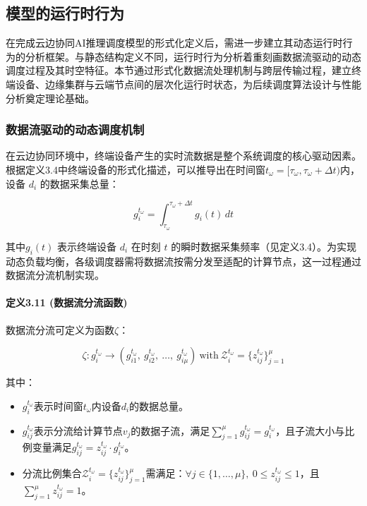 \subsection{模型的运行时行为}

在完成云边协同AI推理调度模型的形式化定义后，需进一步建立其动态运行时行为的分析框架。与静态结构定义不同，运行时行为分析着重刻画数据流驱动的动态调度过程及其时空特征。本节通过形式化数据流处理机制与跨层传输过程，建立终端设备、边缘集群与云端节点间的层次化运行时状态，为后续调度算法设计与性能分析奠定理论基础。

\subsubsection{数据流驱动的动态调度机制}

在云边协同环境中，终端设备产生的实时流数据是整个系统调度的核心驱动因素。根据定义3.4中终端设备的形式化描述，可以推导出在时间窗$t_\omega = [\tau_\omega, \tau_\omega + \Delta t)$内，设备 $d_i$ 的数据采集总量：

\begin{equation}
g_i^{t_\omega} = \int_{\tau_\omega}^{\tau_\omega + \Delta t} g_i(t) \, dt
\end{equation}

其中$g_i(t)$ 表示终端设备 $d_i$ 在时刻 $t$ 的瞬时数据采集频率（见定义3.4）。为实现动态负载均衡，各级调度器需将数据流按需分发至适配的计算节点，这一过程通过数据流分流机制实现。

\paragraph{定义3.11 (数据流分流函数)} 数据流分流可定义为函数$\zeta$：

\[
\zeta: g_i^{t_\omega} \to \left( g_{i1}^{t_\omega},\ g_{i2}^{t_\omega},\ \dots,\ g_{i\mu}^{t_\omega} \right) \ \text{with} \ \mathcal{Z}_i^{t_\omega} = \{z_{ij}^{t_\omega}\}_{j=1}^\mu
\]

其中：
\begin{itemize}
    \item $g_i^{t_\omega}$表示时间窗$t_\omega$内设备$d_i$的数据总量。
    \item $g_{ij}^{t_\omega}$表示分流给计算节点$v_j$的数据子流，满足$\sum\limits_{j=1}^\mu g_{ij}^{t_\omega} = g_i^{t_\omega}$，且子流大小与比例变量满足$g_{ij}^{t_\omega} = z_{ij}^{t_\omega} \cdot g_i^{t_\omega}$。
    \item 分流比例集合$\mathcal{Z}_i^{t_\omega} = \{z_{ij}^{t_\omega}\}_{j=1}^\mu$需满足：$\forall j \in \{1,\dots,\mu\},\ 0 \leq z_{ij}^{t_\omega} \leq 1$，且$\sum\limits_{j=1}^\mu z_{ij}^{t_\omega} = 1$。
\end{itemize}

